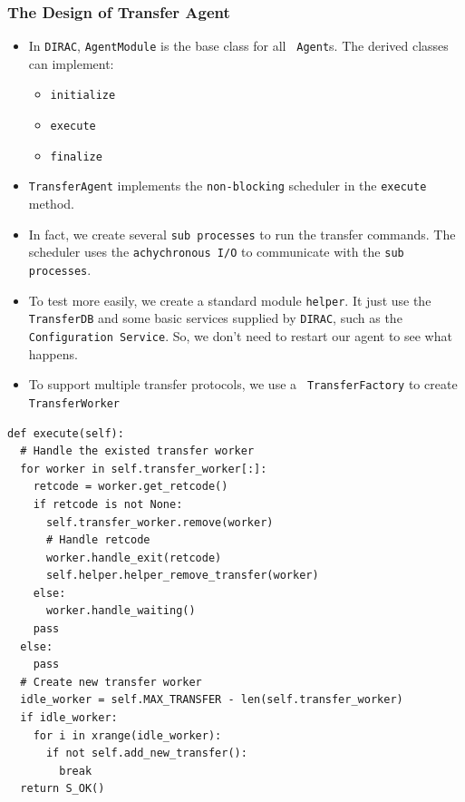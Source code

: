\begin{frame}
    \frametitle{The Design of Transfer Agent}
    \begin{itemize}
        \item In {\tt DIRAC}, {\tt AgentModule} is the base class for all {\tt
            Agent}s. The derived classes can implement:
        \begin{itemize}
            \item {\tt initialize}
            \item {\tt execute}
            \item {\tt finalize}
        \end{itemize}
        \item {\tt TransferAgent} implements the {\tt non-blocking}
              scheduler in the {\tt execute} method.
        \item In fact, we create several {\tt sub processes} to run the 
                transfer commands. The scheduler uses the {\tt achychronous I/O}
                to communicate with the {\tt sub processes}.
        \item To test more easily, we create a standard module {\tt helper}.
              It just use the {\tt TransferDB} and some basic services supplied
              by {\tt DIRAC}, such as the {\tt Configuration Service}.
              So, we don't need to restart our agent to see what happens.
        \item To support multiple transfer protocols, we use a {\tt
                TransferFactory} to create {\tt TransferWorker}
    \end{itemize}
\end{frame}

\newsavebox{\TransferAgentExecute}
\begin{lrbox}{\TransferAgentExecute}
\begin{lstlisting}
def execute(self):
  # Handle the existed transfer worker
  for worker in self.transfer_worker[:]:
    retcode = worker.get_retcode()
    if retcode is not None:
      self.transfer_worker.remove(worker)
      # Handle retcode
      worker.handle_exit(retcode)
      self.helper.helper_remove_transfer(worker)
    else:
      worker.handle_waiting()
    pass
  else:
    pass
  # Create new transfer worker
  idle_worker = self.MAX_TRANSFER - len(self.transfer_worker)
  if idle_worker:
    for i in xrange(idle_worker):
      if not self.add_new_transfer():
        break
  return S_OK()
\end{lstlisting}
\end{lrbox}

